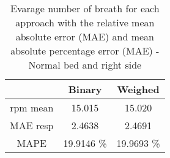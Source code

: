 \begin{table}[H]
    \centering
    \begin{tabular}{|c|c|c|}
    \hline 
    & Binary  & Weighed \\ 
    \hline 
    rpm mean & 15.015 & 15.020\\
    MAE resp &  2.4638  &  2.4691  \\ 
    MAPE  &  19.9146 \%&  19.9693 \%\\ 
    \hline 
    \end{tabular}
    
    \caption{Evarage number of breath for each approach with the relative mean
    absolute error (MAE) and mean absolute percentage error (MAE) - Normal bed
    and right side}
    \label{tab:RightNormalStillMetrics}
    \end{table}
    